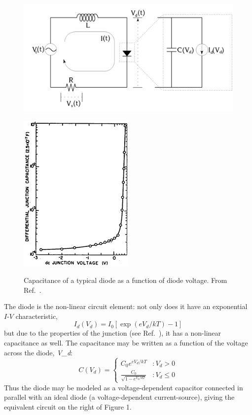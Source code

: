 \documentclass{../lab}
\begin{document}
\begin{figure}[h]
    \centering
    \href{http://experimentationlab.berkeley.edu/sites/default/files/images/Nldimage004.gif}{\includegraphics[width=0.5\linewidth]{images/Nldimage004.png}}
    \caption{}
    \label{fig:Circuit}
\end{figure}

\begin{figure}[h]
    \centering
    \href{http://experimentationlab.berkeley.edu/sites/default/files/images/Nldimage005.gif}{\includegraphics[width=0.4\linewidth]{images/Nldimage005.png}}
    \caption{Capacitance of a typical diode as a function of diode voltage. From Ref.~\cite{Hao}.}
    \label{fig:CapacitanceOfTypicalDiode}
\end{figure}

The diode is the non-linear circuit element: not only does it have an exponential $I$-$V$ characteristic,
\[
    I_d(V_d) = I_0[\exp(eV_d / kT) - 1]
\]
but due to the properties of the junction (see Ref.~\cite{Cvitanovic}), it has a non-linear capacitance as well. The capacitance may be written as a function of the voltage across the diode, \emph{V_{d}}:
\[
    C(V_d) =
    \begin{cases}
        C_0 e^{eV_d/kT} &: V_d > 0 \\
        \frac{C_0}{\sqrt {1-e^{V_d/dT}}} &: V_d \le 0
    \end{cases}
\]
Thus the diode may be modeled as a voltage-dependent capacitor connected in parallel with an ideal diode (a voltage-dependent current-source), giving the equivalent circuit on the right of Figure 1.
\end{document}
